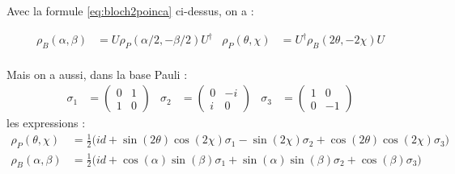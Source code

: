 Avec la formule \eqref{eq:bloch2poinca} ci-dessus, on a :

\begin{align}
	\rho_B(\alpha, \beta) &= U \rho_P(\alpha/2, -\beta/2)U^\dagger  & 
	\rho_P(\theta, \chi) &= U^\dagger \rho_B(2\theta, -2\chi) U
\end{align}
\\
Mais on a aussi, dans la base Pauli :
\begin{align*}
	\sigma_1 &= \begin{pmatrix} 0 & 1 \\ 1 &  0 \end{pmatrix}  &
	\sigma_2 &= \begin{pmatrix} 0 & -i \\  i &  0 \end{pmatrix}  &
	\sigma_3 &= \begin{pmatrix} 1 & 0 \\ 0 & -1 \end{pmatrix}
\end{align*}
les expressions :
\begin{align*}
	\rho_{P}(\theta, \chi) &= \frac{1}{2} \Big( id + \sin(2\theta) \cos(2\chi) \sigma_1 - \sin (2\chi) \sigma_2 + \cos(2\theta) \cos(2\chi) \sigma_3 \Big) \\ 
	\rho_{B}(\alpha, \beta) &= \frac{1}{2} \Big( id + \cos(\alpha) \sin(\beta) \sigma_1 + \sin(\alpha) \sin(\beta) \sigma_2 + \cos (\beta) \sigma_3 \Big)
\end{align*}
\skipl

